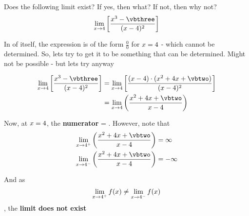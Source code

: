 

\SQUARE\vbone\vbtwo
\POWER{}\vbthree
\MULTIPLY{}\vbfour

\question Does the following limit exist? If yes, then what? If not, then why not?
\[ \lim_{x\to\vbone}\left[ \dfrac{x^3-\vbthree}{(x-\vbone)^2}\right]\]

\watchout[-40pt]

\begin{solution}
  In of itself, the expression is of the form $\frac{0}{0}$ for $x=4$ - which cannot be determined. So, lets try to get it to be something that can be determined. Might not be possible - but lets try anyway
  
  \begin{align}
    \lim_{x\to\vbone}\left[ \dfrac{x^3-\vbthree}{(x-\vbone)^2}\right] &= 
    \lim_{x\to\vbone}\left[ \dfrac{(x-\vbone)\cdot (x^2 + \vbone x + \vbtwo)}{(x-\vbone)^2}\right]\\
    &= \lim_{x\to\vbone}\left( \dfrac{x^2+\vbone x + \vbtwo}{x-\vbone}\right)
  \end{align}
  
  Now, at $x=4$, the \textbf{numerator} = \vbfour. However, note that 
  \begin{align}
    \lim_{x\to\vbone^+}\left( \dfrac{x^2+\vbone x + \vbtwo}{x-\vbone}\right) &= \infty \\
    \lim_{x\to\vbone^-}\left( \dfrac{x^2+\vbone x + \vbtwo}{x-\vbone}\right) &= -\infty
  \end{align}
  
  And as \[ \lim_{x\to4^+} f(x) \neq \lim_{x\to4^-} f(x)\], the \textbf{limit does not exist}
\end{solution}

